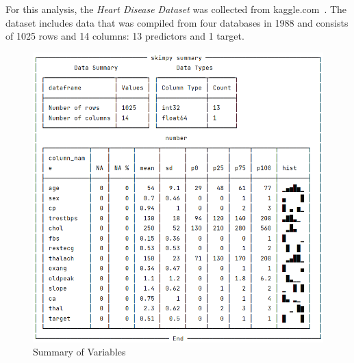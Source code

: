 For this analysis, the \emph{Heart Disease Dataset} was collected from kaggle.com~\citep{Heart-disease-dataset}.
The dataset includes data that was compiled from four databases in 1988 and consists of 1025 rows and 14 columns: 13 predictors and 1 target.
\begin{figure}[!bp]
    \centering
    \caption[Figure]{Summary of Variables} \label{fig:skim}
    \includegraphics[width=.7\textwidth]{plots/skimpy-summary}
\end{figure}

